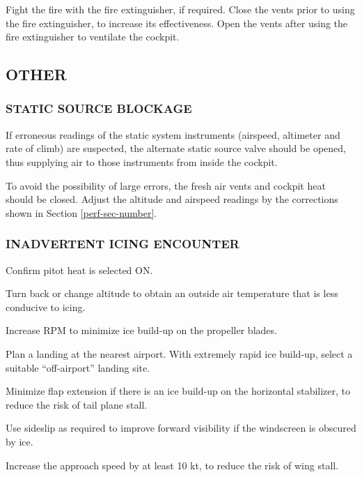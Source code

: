 Fight the fire with the fire extinguisher, if required.  
Close the vents prior to using the fire extinguisher, to increase its effectiveness.
Open the vents after using the fire extinguisher to ventilate the cockpit.

%
%
%

\subsection{OTHER}
\subsubsection{STATIC SOURCE BLOCKAGE}

If erroneous readings of the static system instruments (airspeed, altimeter and rate of climb) are suspected, the
alternate static source valve should be opened, thus supplying air to those instruments from inside the cockpit.

To avoid the possibility of large errors, the fresh air vents and cockpit heat should be closed. 
Adjust the altitude and airspeed readings by the corrections shown in Section
\ref{perf-sec-number}.

\subsubsection{INADVERTENT ICING ENCOUNTER}
\begin{enumerate*}
  \item Confirm pitot heat is selected ON.
  \item Turn back or change altitude to obtain an outside air temperature that is less conducive to icing.
  \item Increase RPM to minimize ice build-up on the propeller blades.
  \item Plan a landing at the nearest airport.  With extremely rapid ice build-up, select a suitable ``off-airport'' landing site.
  \item Minimize flap extension if there is an ice build-up on the horizontal stabilizer, to reduce the risk of tail plane stall.
  \item Use sideslip as required to improve forward visibility if the windscreen is obscured by ice.
  \item Increase the approach speed by at least 10 kt, to reduce the risk of wing stall.
  \end{enumerate*} 

